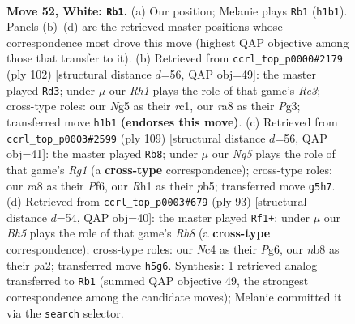 \documentclass[11pt]{article}
\begin{document}
\clearpage

\begin{figure}[p]\centering
\begin{subfigure}{0.46\textwidth}\centering
\resizebox{\linewidth}{!}{%
\newchessgame
\chessboard[
  setfen={rnb2k2/8/4p3/1P1n1pNB/1pN2P2/1P4P1/6KP/7R w - - 3 52},
  showmover=false,
  pgfstyle=straightmove, color=movearrow, markmove={h1-b1}
]}
\caption{}
\end{subfigure}\hfill
\begin{subfigure}{0.46\textwidth}\centering
\resizebox{\linewidth}{!}{%
\newchessgame
\chessboard[
  setfen={8/3k1p2/3n1pp1/1p5p/1P1N3P/2P1RPP1/5K2/2r5 w - - 1 52},
  showmover=false,
  pgfstyle=straightmove, color=movearrow, markmove={e3-d3}
]}
\caption{}
\end{subfigure}
\\[4pt]
\begin{subfigure}{0.46\textwidth}\centering
\resizebox{\linewidth}{!}{%
\newchessgame
\chessboard[
  setfen={6r1/8/4pp1k/1P4p1/4Pn1p/1P5P/2R2NP1/5K2 b - - 0 55},
  showmover=false,
  pgfstyle=straightmove, color=movearrow, markmove={g8-b8}
]}
\caption{}
\end{subfigure}\hfill
\begin{subfigure}{0.46\textwidth}\centering
\resizebox{\linewidth}{!}{%
\newchessgame
\chessboard[
  setfen={8/5pk1/4n1p1/p2NP3/1p3P2/1P3K2/P2R4/7r b - - 2 47},
  showmover=false,
  pgfstyle=straightmove, color=movearrow, markmove={h1-f1}
]}
\caption{}
\end{subfigure}
\caption{\textbf{Move 52, White: \texttt{Rb1}.} (a) Our position; Melanie plays \texttt{Rb1} (\texttt{h1b1}). Panels (b)--(d) are the retrieved master positions whose correspondence most drove this move (highest QAP objective among those that transfer to it). (b) Retrieved from \texttt{ccrl\_top\_p0000\#2179} (ply 102) [structural distance $d$=56, QAP obj=49]: the master played \texttt{Rd3}; under $\mu$ our \emph{Rh1} plays the role of that game's \emph{Re3}; cross-type roles: our \emph{N}g5 as their \emph{r}c1, our \emph{r}a8 as their \emph{P}g3; transferred move \texttt{h1b1} \textbf{(endorses this move)}. (c) Retrieved from \texttt{ccrl\_top\_p0003\#2599} (ply 109) [structural distance $d$=56, QAP obj=41]: the master played \texttt{Rb8}; under $\mu$ our \emph{Ng5} plays the role of that game's \emph{Rg1} (a \textbf{cross-type} correspondence); cross-type roles: our \emph{r}a8 as their \emph{P}f6, our \emph{R}h1 as their \emph{p}b5; transferred move \texttt{g5h7}. (d) Retrieved from \texttt{ccrl\_top\_p0003\#679} (ply 93) [structural distance $d$=54, QAP obj=40]: the master played \texttt{Rf1+}; under $\mu$ our \emph{Bh5} plays the role of that game's \emph{Rh8} (a \textbf{cross-type} correspondence); cross-type roles: our \emph{N}c4 as their \emph{P}g6, our \emph{n}b8 as their \emph{p}a2; transferred move \texttt{h5g6}. Synthesis: 1 retrieved analog transferred to \texttt{Rb1} (summed QAP objective 49, the strongest correspondence among the candidate moves); Melanie committed it via the \texttt{search} selector.}
\label{fig:thought-m102}
\end{figure}
\end{document}

